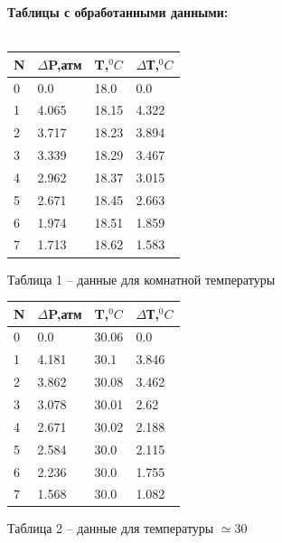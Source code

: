 \documentclass[a4paper,12pt]{article} %
\begin{document}
\textbf{Таблицы с обработанными данными:}
\\ \\
\begin{minipage}{0.5\textwidth}
  \begin{flushleft}

	\begin{tabular}{ | l | l | l | l |}
\hline
N & $\Delta$P,атм &T,$^0C$ & $\Delta$Т,$^0C$ \\ \hline
0 & 0.0 & 18.0 & 0.0 \\
1 & 4.065 & 18.15 & 4.322 \\
2 & 3.717 & 18.23 & 3.894 \\
3 & 3.339 & 18.29 & 3.467 \\
4 & 2.962 & 18.37 & 3.015 \\
5 & 2.671 & 18.45 & 2.663 \\
6 & 1.974 & 18.51 & 1.859 \\
7 & 1.713 & 18.62 & 1.583 \\
\hline
\end{tabular}


Таблица 1 -- данные для комнатной температуры
  \end{flushleft}
\end{minipage}
\begin{minipage}{0.5\textwidth}
  \begin{flushright}
	\begin{tabular}{ | l | l | l | l |}
\hline
N & $\Delta$P,атм &T,$^0C$ & $\Delta$Т,$^0C$ \\ \hline
0 & 0.0 & 30.06 & 0.0 \\
1 & 4.181 & 30.1 & 3.846 \\
2 & 3.862 & 30.08 & 3.462 \\
3 & 3.078 & 30.01 & 2.62 \\
4 & 2.671 & 30.02 & 2.188 \\
5 & 2.584 & 30.0 & 2.115 \\
6 & 2.236 & 30.0 & 1.755 \\
7 & 1.568 & 30.0 & 1.082 \\
\hline
\end{tabular}

 
Таблица 2 -- данные для температуры $\simeq 30$
  \end{flushright}
\end{minipage}
\end{document}
